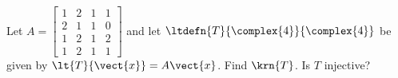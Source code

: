 Let 
$A = 
\begin{bmatrix}  
1 & 2 & 1 & 1 \\ 
2 & 1 & 1 & 0 \\ 
1 & 2 & 1 & 2 \\ 
1 & 2 & 1 & 1 
\end{bmatrix}$ 
and let 
$\ltdefn{T}{\complex{4}}{\complex{4}}$ be given by 
$\lt{T}{\vect{x}}=A\vect{x}$.  
Find $\krn{T}$.  
Is $T$ injective?
